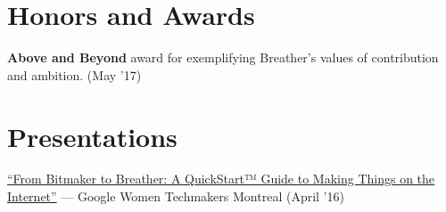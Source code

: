 \documentclass[letterpaper,10.8pt]{article}
\begin{document}
\section{Honors and Awards}
\begin{description}[font=$\bullet$]
\item {\textbf{Above and Beyond} award for exemplifying Breather’s values of contribution and ambition. (May '17)}
\vspace{-2px}
\end{description}

\section{Presentations}
\begin{description}[font=$\bullet$]
\item {\href{https://www.youtube.com/watch?v=6EHbfAmA_0c}{“From Bitmaker to Breather: A QuickStart™ Guide to Making Things on the Internet”} — Google Women Techmakers Montreal (April '16)}
\end{description}

\end{document}
